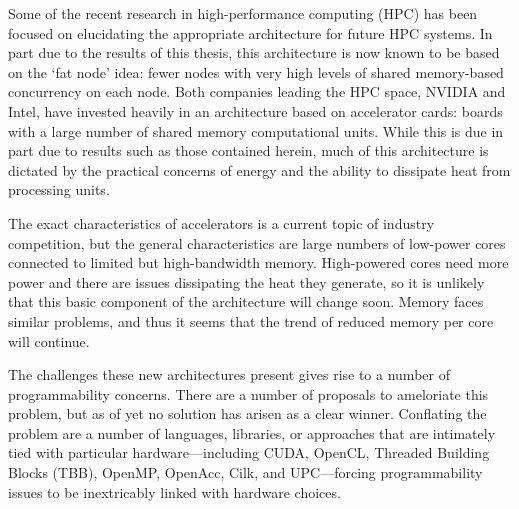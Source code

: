 
Some of the recent research in high-performance computing (HPC) has
been focused on elucidating the appropriate architecture for future HPC
systems.  In part due to the results of this thesis, this architecture
is now known to be based on the `fat node' idea: fewer nodes with
very high levels of shared memory-based concurrency on each node.
Both companies leading the HPC space, NVIDIA and Intel, have invested
heavily in an architecture based on accelerator cards: boards with a
large number of shared memory computational units.  While this is due
in part due to results such as those contained herein, much of this
architecture is dictated by the practical concerns of energy and the
ability to dissipate heat from processing units.


The exact characteristics of accelerators is a current topic of
industry competition, but the general characteristics are large numbers
of low-power cores connected to limited but high-bandwidth memory.
High-powered cores need more power and there are issues dissipating the
heat they generate, so it is unlikely that this basic component of the
architecture will change soon.  Memory faces similar problems, and thus
it seems that the trend of reduced memory per core will continue.


The challenges these new architectures present gives rise to a number
of programmability concerns.  There are a number of proposals to
ameloriate this problem, but as of yet no solution has arisen as a
clear winner.  Conflating the problem are a number of languages,
libraries, or approaches that are intimately tied with particular
hardware---including CUDA, OpenCL, Threaded Building Blocks (TBB),
OpenMP, OpenAcc, Cilk, and UPC---forcing programmability issues to be
inextricably linked with hardware choices.

